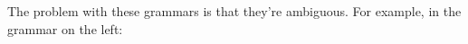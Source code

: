 \documentclass[11pt,fleqn]{article}
\begin{document}
\begin{enumerate}
\begin{multicols}{2}
            \begin{center}

              \begin{grammar}[1.5]
                  \\
                  \\
              \end{grammar}

            \end{center}

          \end{multicols}

          \vspace{-2mm}

          The problem with these grammars is that they're ambiguous.  For
          example, in the grammar on the left:

          \vspace{-2.75mm}

          {


            \raggedcolumns

            \begin{multicols}{2}


            \columnbreak

              \begin{center}



\end{center}
\end{multicols}}
\end{enumerate}
\end{document}
